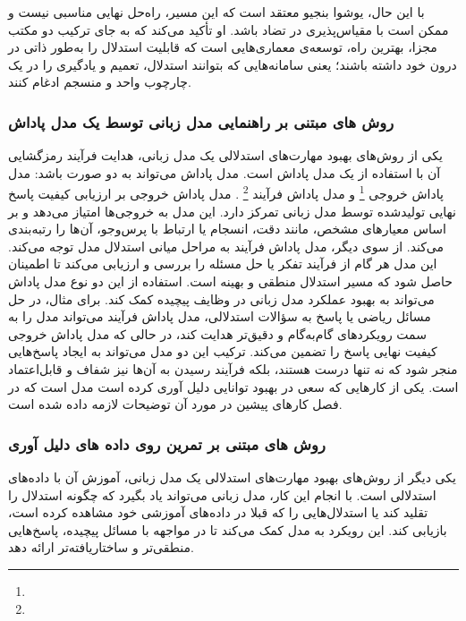 با این حال، یوشوا بنجیو معتقد است که این مسیر، راه‌حل نهایی مناسبی نیست و ممکن است با مقیاس‌پذیری در تضاد باشد. او تأکید می‌کند که به جای ترکیب دو مکتب مجزا، بهترین راه، توسعه‌ی معماری‌هایی است که قابلیت استدلال را به‌طور ذاتی در درون خود داشته باشند؛ یعنی سامانه‌هایی که بتوانند استدلال، تعمیم و یادگیری را در یک چارچوب واحد و منسجم ادغام کنند.

\subsubsection{
روش های مبتنی بر راهنمایی مدل زبانی توسط یک مدل پاداش
}

یکی از روش‌های بهبود مهارت‌های استدلالی یک مدل زبانی، هدایت فرآیند رمزگشایی آن با استفاده از یک مدل پاداش است. مدل پاداش می‌تواند به دو صورت باشد: مدل پاداش خروجی
\footnote{}
و مدل پاداش فرآیند
\footnote{}
\cite{b31}
.
مدل پاداش خروجی بر ارزیابی کیفیت پاسخ نهایی تولیدشده توسط مدل زبانی تمرکز دارد. این مدل به خروجی‌ها امتیاز می‌دهد و بر اساس معیارهای مشخص، مانند دقت، انسجام یا ارتباط با پرس‌وجو، آن‌ها را رتبه‌بندی می‌کند. از سوی دیگر، مدل پاداش فرآیند به مراحل میانی استدلال مدل توجه می‌کند. این مدل هر گام از فرآیند تفکر یا حل مسئله را بررسی و ارزیابی می‌کند تا اطمینان حاصل شود که مسیر استدلال منطقی و بهینه است.
استفاده از این دو نوع مدل پاداش می‌تواند به بهبود عملکرد مدل زبانی در وظایف پیچیده کمک کند. برای مثال، در حل مسائل ریاضی یا پاسخ به سؤالات استدلالی، مدل پاداش فرآیند می‌تواند مدل را به سمت رویکردهای گام‌به‌گام و دقیق‌تر هدایت کند، در حالی که مدل پاداش خروجی کیفیت نهایی پاسخ را تضمین می‌کند. ترکیب این دو مدل می‌تواند به ایجاد پاسخ‌هایی منجر شود که نه تنها درست هستند، بلکه فرآیند رسیدن به آن‌ها نیز شفاف و قابل‌اعتماد است.
یکی از کارهایی که سعی در بهبود توانایی دلیل آوری کرده است مدل
\cite{b32}
است که در فصل کارهای پیشین در مورد آن توضیحات لازمه داده شده است.

\subsubsection{
روش های مبتنی بر تمرین روی داده های دلیل آوری
}
یکی دیگر از روش‌های بهبود مهارت‌های استدلالی یک مدل زبانی، آموزش آن با داده‌های استدلالی است. با انجام این کار، مدل زبانی می‌تواند یاد بگیرد که چگونه استدلال را تقلید کند یا استدلال‌هایی را که قبلا در داده‌های آموزشی خود مشاهده کرده است، بازیابی کند. این رویکرد به مدل کمک می‌کند تا در مواجهه با مسائل پیچیده، پاسخ‌هایی منطقی‌تر و ساختاریافته‌تر ارائه دهد.
\cite{b33}

